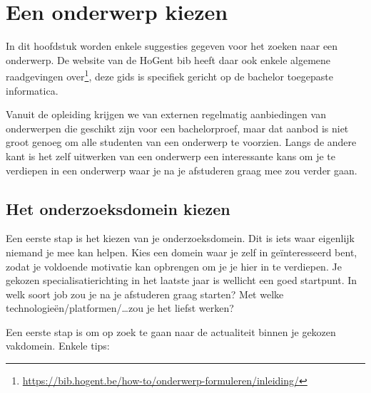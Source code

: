 \chapter{Een onderwerp kiezen}
\label{ch:onderwerp}

In dit hoofdstuk worden enkele suggesties gegeven voor het zoeken naar een onderwerp. De website van de HoGent bib heeft daar ook enkele algemene raadgevingen over\footnote{\url{https://bib.hogent.be/how-to/onderwerp-formuleren/inleiding/}}, deze gids is specifiek gericht op de bachelor toegepaste informatica.

Vanuit de opleiding krijgen we van externen regelmatig aanbiedingen van onderwerpen die geschikt zijn voor een bachelorproef, maar dat aanbod is niet groot genoeg om alle studenten van een onderwerp te voorzien. Langs de andere kant is het zelf uitwerken van een onderwerp een interessante kans om je te verdiepen in een onderwerp waar je na je afstuderen graag mee zou verder gaan.

\section{Het onderzoeksdomein kiezen}
\label{sec:het_onderzoeksdomein_kiezen}

Een eerste stap is het kiezen van je onderzoeksdomein. Dit is iets waar eigenlijk niemand je mee kan helpen. Kies een domein waar je zelf in geïnteresseerd bent, zodat je voldoende motivatie kan opbrengen om je je hier in te verdiepen. Je gekozen specialisatierichting in het laatste jaar is wellicht een goed startpunt. In welk soort job zou je na je afstuderen graag starten? Met welke technologieën/platformen/\ldots zou je het liefst werken?

Een eerste stap is om op zoek te gaan naar de actualiteit binnen je gekozen vakdomein. Enkele tips:

